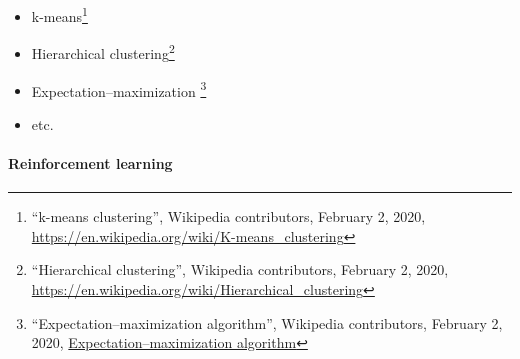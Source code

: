 \documentclass[10pt]{article}
\newif\ifen
\newif\ifde
\newcommand{\en}[1]{\ifen#1\fi}
\newcommand{\de}[1]{\ifde#1\fi}
\begin{document}
				\de{\noindent Folgende unüberwachte Lernalgorithmen können zur Gruppierung verwendet werden:}
				\en{\noindent The following unsupervised learning algorithms can be used for clustering:}
				
				\begin{itemize}
					\item k-means\footnote{``k-means clustering'', Wikipedia contributors, February 2, 2020, \url{https://en.wikipedia.org/wiki/K-means_clustering}}
					\item Hierarchical clustering\footnote{``Hierarchical clustering'', Wikipedia contributors, February 2, 2020, \url{https://en.wikipedia.org/wiki/Hierarchical_clustering}}
					\item Expectation–maximization \footnote{``Expectation–maximization algorithm'', Wikipedia contributors, February 2, 2020, \url{Expectation–maximization algorithm}}
					\item etc.
				\end{itemize}
			
				\de{Eine Technik, die hierarchische Clusteranalyse, wird später verwendet um die Einführung von Hierarchien zu erleichtern. Für die allgemeine Analyse, den Finden von optimalen Parametern für das Lernen von Modellen, wird diese Art des Lernens in dieser Arbeit nicht verwendet.}
				\en{One technique, hierarchical clustering, is used later to facilitate the introduction of hierarchies. For the general analysis, the finding of optimal parameters for learning models, this kind of learning is not used in this thesis.}

			\paragraph{Reinforcement learning}
			\label{sec:section_reinforcement_learning}
				\de{Reinforcement learning\footnote{``Reinforcement learning'', Wikipedia contributors, January 31, 2020, \url{https://en.wikipedia.org/wiki/Reinforcement_learning}} ist eine Art des maschinellen Lernens, bei der ein Agent selbstständig die bestmögliche Strategie für die Erreichung eines Zieles erlernt. Für die Erreichung des Ziels sind Aktionen notwendig, welche zu bestimmten Zeitpunkten Belohnungen hervorbringen. Diese Belohnungen können auch negative sein (Bestrafung). Anhand dieser Belohnungen gilt es in Summe den bestmöglichen Belohnungswert zu erzielen. Bei der Klassifizierung von Bildern ist diese Art des Lernens nicht relevant, weshalb hier auch nicht weiter darauf eingegangen wird.}
				\en{Reinforcement learning\footnote{``Reinforcement learning'', Wikipedia contributors, January 31, 2020, \url{https://en.wikipedia.org/wiki/Reinforcement_learning}} is a type of machine learning in which an agent independently learns the best possible strategy for achieving a goal. To achieve the goal, actions are necessary which produce rewards at certain points in time. These rewards can also be negative (punishment). Based on these rewards, the aim is to achieve the best possible reward value. This type of learning is not relevant for the classification of images, which is why it will not be discussed further here.}
\end{document}
